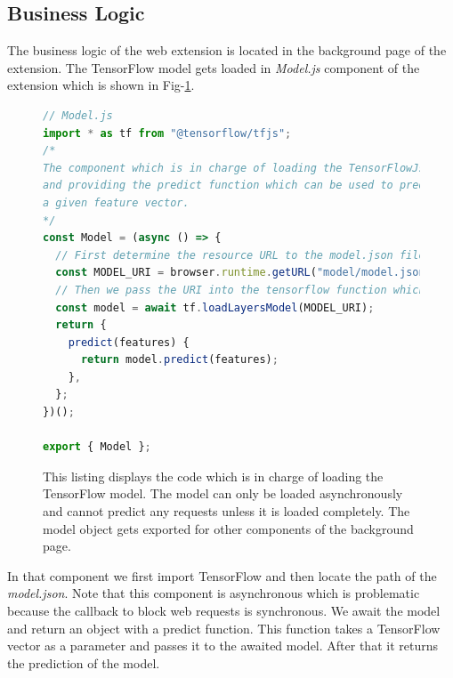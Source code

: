\subsection{Business Logic}
\label{sec:bl}
The business logic of the web extension is located in the background page of the extension. 
The TensorFlow model gets loaded in \emph{Model.js} component of the extension which is shown in Fig-\ref{fig:Model}.
\begin{figure}[ht!]
  \begin{lstlisting}[language=JavaScript]
// Model.js
import * as tf from "@tensorflow/tfjs";
/*
The component which is in charge of loading the TensorFlowJs model 
and providing the predict function which can be used to predict 
a given feature vector.
*/ 
const Model = (async () => {
  // First determine the resource URL to the model.json file which includes all the metadata to the given model
  const MODEL_URI = browser.runtime.getURL("model/model.json");
  // Then we pass the URI into the tensorflow function which downloads the model structure and the model weights and stores them into memory
  const model = await tf.loadLayersModel(MODEL_URI);
  return {
    predict(features) {
      return model.predict(features);
    },
  };
})();

export { Model };
  \end{lstlisting}
  \caption{This listing displays the code which is in charge of loading the TensorFlow model. The model can only be loaded asynchronously and cannot predict any 
  requests unless it is loaded completely. The model object gets exported for other components of the background page.}
  \label{fig:Model}
\end{figure}

In that component we first import TensorFlow and then locate the path of the \emph{model.json}. Note that this component is asynchronous
which is problematic because the callback to block web requests is synchronous. We await the model and return an object with a predict function.
This function takes a TensorFlow vector as a parameter and passes it to the awaited model. After that it returns the prediction of the model.

